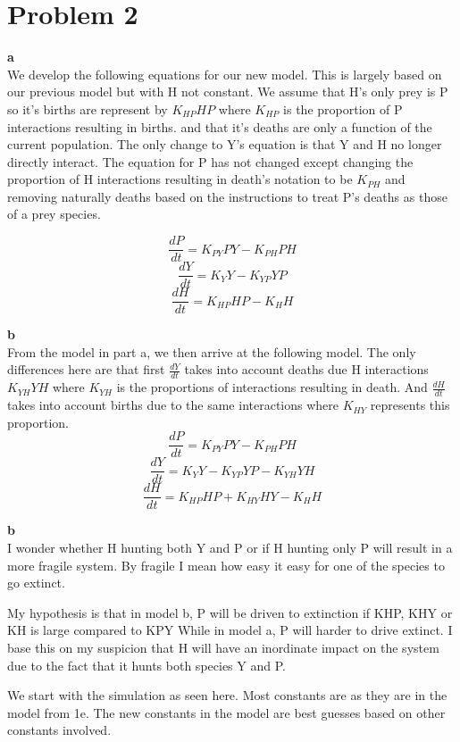 \documentclass{article}
\begin{document}
  \pagebreak
  \section*{Problem 2}

  \vspace{.5cm}
  \textbf{a}\\
  We develop the following equations for our new model. This is largely based on our
  previous model but with H not constant. We assume that H's only prey is P so it's births
  are represent by $K_{HP}HP$ where $K_{HP}$ is the proportion of P interactions resulting in
  births. and that
  it's deaths are only a function of the current population. The only change to Y's
  equation is that Y and H no longer directly interact. The equation for P has not changed
  except changing the proportion of H interactions resulting in death's notation to be $K_{PH}$ and
  removing naturally deaths based on the instructions to treat P's deaths as those of a prey species.

  \[
    \frac{dP}{dt} = K_{PY}PY - K_{PH}PH
  \]
  \[
    \frac{dY}{dt} = K_{Y}Y - K_{YP}YP
  \]
  \[
    \frac{dH}{dt} = K_{HP}HP - K_{H}H
  \]

  \textbf{b}\\

  From the model in part a, we then arrive at the following model. The only differences here are
  that first $\frac{dY}{dt}$ takes into account deaths due H interactions $K_{YH}YH$ where $K_{YH}$ is
  the proportions of interactions resulting in death. And $\frac{dH}{dt}$ takes into account
  births due to the same interactions where $K_{HY}$ represents this proportion.
  \[
    \frac{dP}{dt} = K_{PY}PY - K_{PH}PH
  \]
  \[
    \frac{dY}{dt} = K_{Y}Y - K_{YP}YP - K_{YH}YH
  \]
  \[
    \frac{dH}{dt} = K_{HP}HP + K_{HY}HY - K_{H}H
  \]

  \textbf{b}\\

  I wonder whether H hunting both Y and P or if H hunting only P will result in a more
  fragile system. By fragile I mean how easy it easy for one of the species to go extinct.

  My hypothesis is that in model b, P will be driven to extinction if KHP, KHY or KH is
  large compared to KPY
  While in model a, P will harder to drive extinct.
  I base this on my suspicion that H will have an inordinate impact on the system due to the fact
  that it hunts both species Y and P.

  We start with the simulation as seen here. Most constants are as they are in the model
  from 1e. The new constants in the model are best guesses based on other constants involved.\\
\end{document}
